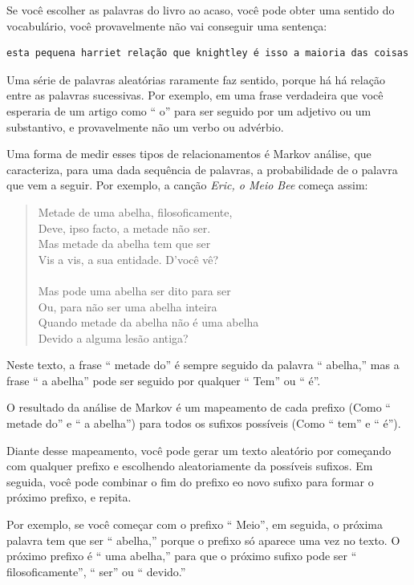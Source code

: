 \documentclass[10pt]{book}
\begin{document}
\begin{v erbatim}
Se você escolher as palavras do livro ao acaso, você pode obter uma
sentido do vocabulário, você provavelmente não vai conseguir uma sentença:

\begin{verbatim}
esta pequena harriet relação que knightley é isso a maioria das coisas
\end{verbatim}
%
Uma série de palavras aleatórias raramente faz sentido, porque há
há relação entre as palavras sucessivas. Por exemplo, em
uma frase verdadeira que você esperaria de um artigo como `` o'' para
ser seguido por um adjetivo ou um substantivo, e provavelmente não um verbo
ou advérbio.

Uma forma de medir esses tipos de relacionamentos é Markov
análise, que
caracteriza, para uma dada sequência de palavras, a probabilidade de o
palavra que vem a seguir. Por exemplo, a canção {\em Eric, o Meio
  Bee} começa assim:

\begin{quote}
Metade de uma abelha, filosoficamente, \\
Deve, ipso facto, a metade não ser. \\
Mas metade da abelha tem que ser \\
Vis a vis, a sua entidade. D'você vê? \\
\\
Mas pode uma abelha ser dito para ser \\
Ou, para não ser uma abelha inteira \\
Quando metade da abelha não é uma abelha \\
Devido a alguma lesão antiga? \\
\end{quote}
%
Neste texto,
a frase `` metade do'' é sempre seguido da palavra `` abelha,''
mas a frase `` a abelha'' pode ser seguido por qualquer
`` Tem'' ou `` é''.

O resultado da análise de Markov é um mapeamento de cada prefixo
(Como `` metade do'' e `` a abelha'') para todos os sufixos possíveis
(Como `` tem'' e `` é'').

Diante desse mapeamento, você pode gerar um texto aleatório por
começando com qualquer prefixo e escolhendo aleatoriamente da
possíveis sufixos. Em seguida, você pode combinar o fim do
prefixo eo novo sufixo para formar o próximo prefixo, e repita.

Por exemplo, se você começar com o prefixo `` Meio'', em seguida, o
próxima palavra tem que ser `` abelha,'' porque o prefixo só aparece
uma vez no texto. O próximo prefixo é `` uma abelha,'' para que o
próximo sufixo pode ser `` filosoficamente'', `` ser'' ou `` devido.''


\end{v erbatim}
\end{document}
